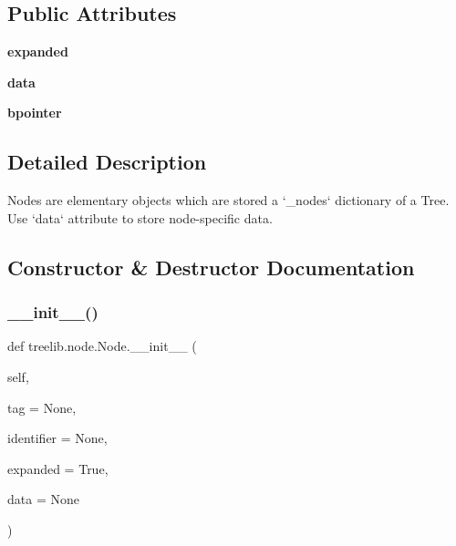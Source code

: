 \subsection*{Public Attributes}
\begin{DoxyCompactItemize}
\item 
\mbox{\label{classtreelib_1_1node_1_1Node_aa950593d97e674ba241fa1e218a9ce27}} 
{\bfseries expanded}
\item 
\mbox{\label{classtreelib_1_1node_1_1Node_aaf824d02c9fbb43824bb68c71fe6b672}} 
{\bfseries data}
\item 
\mbox{\label{classtreelib_1_1node_1_1Node_aecba6620e713e926090679d6052665eb}} 
{\bfseries bpointer}
\end{DoxyCompactItemize}


\subsection{Detailed Description}
\begin{DoxyVerb}Nodes are elementary objects which are stored a `_nodes` dictionary of a Tree.
Use `data` attribute to store node-specific data.
\end{DoxyVerb}
 

\subsection{Constructor \& Destructor Documentation}
\mbox{\label{classtreelib_1_1node_1_1Node_a40dc94dc2ce16b607bf735acb320d7bb}} 
\subsubsection{\texorpdfstring{\+\_\+\+\_\+init\+\_\+\+\_\+()}{\_\_init\_\_()}}
{\footnotesize\ttfamily def treelib.\+node.\+Node.\+\_\+\+\_\+init\+\_\+\+\_\+ (\begin{DoxyParamCaption}\item[{}]{self,  }\item[{}]{tag = {\ttfamily None},  }\item[{}]{identifier = {\ttfamily None},  }\item[{}]{expanded = {\ttfamily True},  }\item[{}]{data = {\ttfamily None} }\end{DoxyParamCaption})}

